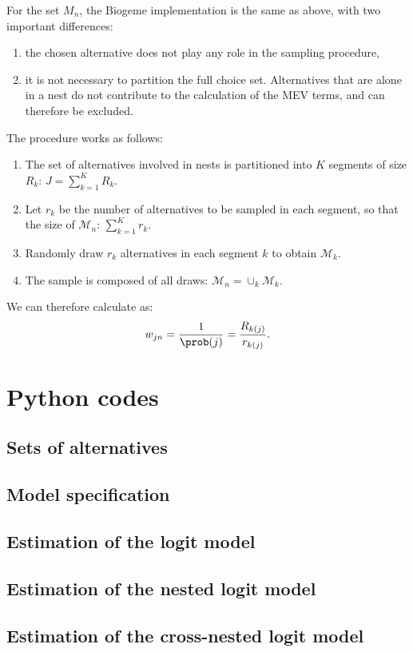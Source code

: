 \documentclass[12pt,a4paper]{article}
\newcommand*{\examplesPath}{../../examples}
\begin{document}
For the set $M_n$, the Biogeme implementation is the same as above, with two important differences:
\begin{enumerate}
\item the chosen alternative does not play any role in the sampling procedure,
\item it is not necessary to partition the full choice
  set. Alternatives that are alone in a nest do not contribute to
  the calculation of the MEV terms, and can therefore be excluded.
\end{enumerate}

The procedure works as follows:
\begin{enumerate}
  \item The set of alternatives involved in nests is partitioned into $K$ segments of size $R_k$: $J=\sum_{k=1}^K R_k$.
  \item Let $r_k$ be the number of alternatives to be sampled in each segment, so that the size of $\mathcal{M}_n$: $\sum_{k=1}^K r_k$.
  \item Randomly draw $r_k$ alternatives in each segment $k$ to obtain $\mathcal{M}_k$.
  \item The sample is composed of  all draws: $\mathcal{M}_n = \cup_k \mathcal{M}_k$.
\end{enumerate}

We can therefore calculate  as:
\[
    w_{jn} = \frac{1}{\prob(j)} = \frac{R_{k(j)}}{r_{k(j)}}.
\]

\section{Python codes}

\subsection{Sets of alternatives}
\label{sec:alternatives}


\subsection{Model specification}
\label{sec:specification}


\subsection{Estimation of the logit model}
\label{sec:logit}


\subsection{Estimation of the nested logit model}
\label{sec:nested}


\subsection{Estimation of the cross-nested logit model}
\label{sec:cnl}

\end{document}
